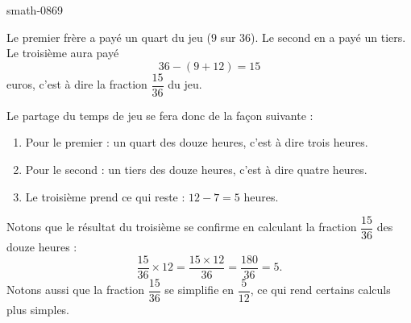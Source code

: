 
\begin{corrige}{smath-0869}

    Le premier frère a payé un quart du jeu (\( 9\) sur \( 36\)). Le second en a payé un tiers. Le troisième aura payé 
    \begin{equation}
        36-(9+12)=15
    \end{equation}
    euros, c'est à dire la fraction \( \dfrac{ 15 }{ 36 }\) du jeu.

    Le partage du temps de jeu se fera donc de la façon suivante :
    \begin{enumerate}
        \item
           Pour le premier : un quart des douze heures, c'est à dire trois heures.
       \item
           Pour le second : un tiers des douze heures, c'est à dire quatre heures.
       \item
           Le troisième prend ce qui reste : \( 12-7=5\) heures.
    \end{enumerate}
    Notons que le résultat du troisième se confirme en calculant la fraction \( \dfrac{ 15 }{ 36 }\) des douze heures :
    \begin{equation}
        \frac{ 15 }{ 36 }\times 12=\frac{ 15\times 12 }{ 36 }=\frac{ 180 }{ 36 }=5.
    \end{equation}
    Notons aussi que la fraction \( \dfrac{ 15 }{ 36 }\) se simplifie en \( \dfrac{ 5 }{ 12 }\), ce qui rend certains calculs plus simples.

\end{corrige}
